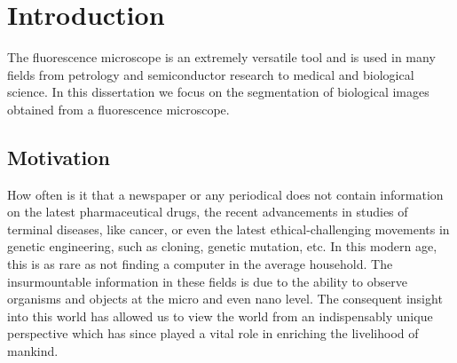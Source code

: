 
\chapter{Introduction} %

\label{chap:Chapter1} %



The fluorescence microscope is an extremely versatile tool and is used in many fields from petrology and semiconductor research to medical and biological science.  In this dissertation we focus on the segmentation of biological images obtained from a fluorescence microscope.

\section{Motivation}

How often is it that a newspaper or any periodical does not contain information on the latest pharmaceutical drugs, the recent advancements in studies of terminal diseases, like cancer, or even the latest ethical-challenging movements in genetic engineering, such as cloning, genetic mutation, etc. 
In this modern age, this is as rare as not finding a computer in the average household. 
The insurmountable information in these fields is due to the ability to observe organisms and objects at the micro and even nano level. 
The consequent insight into this world has allowed us to view the world from an indispensably unique perspective which has since played a vital role in enriching the livelihood of mankind. 

